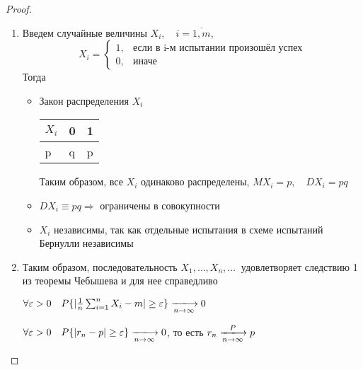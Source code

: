 \documentclass[a4paper, 12pt]{article}
\theoremstyle{definition}
\theoremstyle{leads}
\theoremstyle{example}
\newcommand{\infseq}[3]{%
	\ensuremath{#1_#2, \dots, #1_#3, \dots}\ }
\newcommand{\infseqX}{%
	\infseq{X}{1}{n}}
\begin{document}
\begin{proof}
	\begin{enumerate}
	    \item Введем случайные величины $X_i, \quad i = \overline{1,m}$, 
	    \begin{displaymath}
	    	X_i = \begin{cases}
	    	1, & \text{если в i-м испытании произошёл успех}\\
	    	0, & \text{иначе}
	    	\end{cases}
	    \end{displaymath}
	    Тогда 
	    \begin{itemize}
	    \item Закон распределения $X_i$
	    \begin{center}
	    	\centering
	        \begin{tabular}{|l|l|l|}
	    		\hline
	    		$X_i$ & 0 & 1\\ \hline
	    		p & q & p \\
	    		\hline
	    	\end{tabular}
	    \end{center}
    Таким образом, все $X_i$ одинаково распределены, $MX_i = p,\quad DX_i = pq$
    \item $DX_i \equiv pq \Longrightarrow$ ограничены в совокупности
    \item $X_i$ независимы, так как отдельные испытания в схеме испытаний Бернулли независимы
    \end{itemize}
	    \item Таким образом, последовательность $\infseqX$ удовлетворяет следствию 1 из теоремы Чебышева и для нее справедливо
	    \begin{center}
	    	\centering
	    	$\forall \varepsilon > 0 \quad P\{|\frac{1}{n}\sum_{i=1}^{n}X_i - m|\geq \varepsilon\} \xlongrightarrow[n \rightarrow \infty]{} 0$
	    \end{center}
    \begin{center}
    	\centering
    	$\forall \varepsilon > 0 \quad P\{|r_n - p| \geq \varepsilon\} \xlongrightarrow[n \rightarrow \infty]{} 0$, то есть $r_n \xlongrightarrow[n \rightarrow \infty] {P} p$
    \end{center}
	\end{enumerate}
\end{proof}
\end{document}
